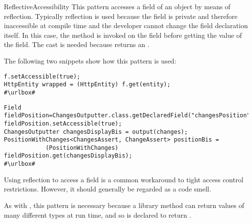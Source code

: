 \begin{pattern}{ReflectiveAccessibility}
This pattern accesses a field of an object by means of reflection.
Typically reflection is used because the field is private and therefore
inaccessible at compile time and the developer cannot change the field
declaration itself.
In this case, the method  is invoked on the field
before getting the value of the field.
The cast is needed because  returns an .

\instances{}
The following two snippets show how this pattern is used:

\def\urlvar{http://bit.ly/loopj_android_async_http_2SOISRr}
\begin{verbatim}
f.setAccessible(true);
HttpEntity wrapped = (HttpEntity) f.get(entity);
#\urlbox#
\end{verbatim}

\def\urlvar{http://bit.ly/joel_costigliola_assertj_db_2Ip1Rho}
\begin{verbatim}
Field fieldPosition=ChangesOutputter.class.getDeclaredField("changesPosition");
fieldPosition.setAccessible(true);
ChangesOutputter changesDisplayBis = output(changes);
PositionWithChanges<ChangesAssert, ChangeAssert> positionBis = 
            (PositionWithChanges) fieldPosition.get(changesDisplayBis);
#\urlbox#
\end{verbatim}


\discussion{}
Using reflection to access a field is a common workaround to tight access
  control restrictions. However, it should generally be regarded as a code
  smell.

As with , this pattern is necessary because
a library method can return values of many different types at run time,
and so is declared to return .


\end{pattern}
